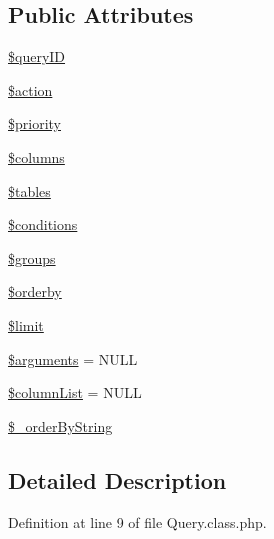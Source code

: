 \subsection*{Public Attributes}
\begin{DoxyCompactItemize}
\item 
\hyperlink{classQuery_a67666b2fcd6c60e73d8329f7d22044dc}{\$query\+I\+D}
\item 
\hyperlink{classQuery_a62c36010085369fc0508ea548660be9f}{\$action}
\item 
\hyperlink{classQuery_a4d64f61fd525a70ebc2aaa6ab8291e20}{\$priority}
\item 
\hyperlink{classQuery_a7cf97254cbd55fdbb9e149723498d9ba}{\$columns}
\item 
\hyperlink{classQuery_a5c74163d1615b141456b123c11fa9d92}{\$tables}
\item 
\hyperlink{classQuery_a5c71d786a82b2cc014968d2553b6bc9d}{\$conditions}
\item 
\hyperlink{classQuery_a76992fbfae6d700e65dfde28911a2475}{\$groups}
\item 
\hyperlink{classQuery_aa955216a83dfe57cdd9600b44b38ebac}{\$orderby}
\item 
\hyperlink{classQuery_abe481cf8b7f42b513a4f64cf7fb0ffea}{\$limit}
\item 
\hyperlink{classQuery_a49166e3c5f5198e4b899c8ee47b6258a}{\$arguments} = N\+U\+L\+L
\item 
\hyperlink{classQuery_a113bcdfdc3bf6acef684a06ae324334a}{\$column\+List} = N\+U\+L\+L
\item 
\hyperlink{classQuery_aaf035e5cfac7afe46163a6ba4c55c34b}{\$\+\_\+order\+By\+String}
\end{DoxyCompactItemize}


\subsection{Detailed Description}


Definition at line 9 of file Query.\+class.\+php.



